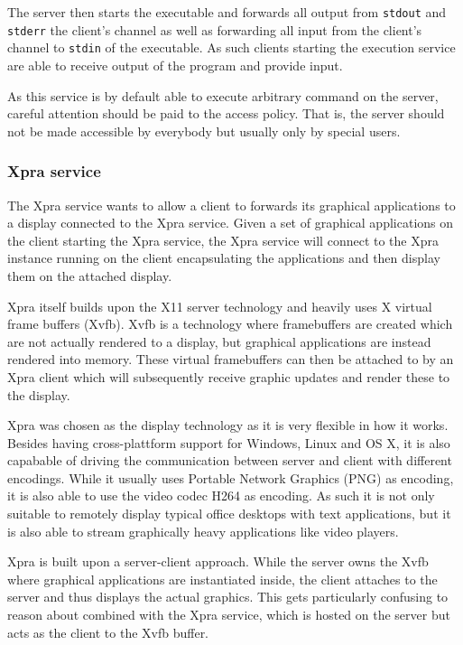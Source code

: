 The server then starts the executable and forwards all output from \lstinline{stdout} and \lstinline{stderr} the client's channel as well as forwarding all input from the client's channel to \lstinline{stdin} of the executable.
As such clients starting the execution service are able to receive output of the program and provide input.

As this service is by default able to execute arbitrary command on the server, careful attention should be paid to the access policy.
That is, the server should not be made accessible by everybody but usually only by special users.

\subsubsection{Xpra service}
\label{sec:xpra-service}

The Xpra service wants to allow a client to forwards its graphical applications to a display connected to the Xpra service.
Given a set of graphical applications on the client starting the Xpra service, the Xpra service will connect to the Xpra instance running on the client encapsulating the applications and then display them on the attached display.

Xpra itself builds upon the X11 server technology and heavily uses X virtual frame buffers (Xvfb).
Xvfb is a technology where framebuffers are created which are not actually rendered to a display, but graphical applications are instead rendered into memory.
These virtual framebuffers can then be attached to by an Xpra client which will subsequently receive graphic updates and render these to the display.

Xpra was chosen as the display technology as it is very flexible in how it works.
Besides having cross-plattform support for Windows, Linux and OS X, it is also capabable of driving the communication between server and client with different encodings.
While it usually uses Portable Network Graphics (PNG) as encoding, it is also able to use the video codec H264 as encoding.
As such it is not only suitable to remotely display typical office desktops with text applications, but it is also able to stream graphically heavy applications like video players.

Xpra is built upon a server-client approach.
While the server owns the Xvfb where graphical applications are instantiated inside, the client attaches to the server and thus displays the actual graphics.
This gets particularly confusing to reason about combined with the Xpra service, which is hosted on the server but acts as the client to the Xvfb buffer.

